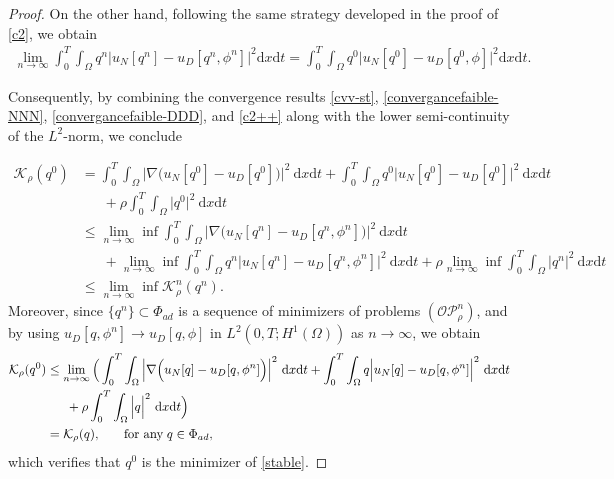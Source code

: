 \documentclass[a4paper,12pt,reqno,natbib]{amsart}
\newcommand{\dx} {\displaystyle\mathrm{d}x}
\newcommand{\dt} {\displaystyle\mathrm{d}t}
\begin{document}
{\begin{proof}
On the other hand, following the same strategy developed in the proof of \eqref{c2}, we obtain
\begin{align} \label{c2++}
    \lim_{n \rightarrow \infty} \int_0^T \int_\Omega q^n \Big| u_N[q^n] - u_D[q^n, \phi^n] \Big|^2 \dx \dt = \int_0^T \int_\Omega q^0 \Big| u_N[q^0] - u_D[q^0, \phi] \Big|^2 \dx \dt.
\end{align}

Consequently, by combining the convergence results \eqref{cvv-st}, \eqref{convergancefaible-NNN}, \eqref{convergancefaible-DDD}, and \eqref{c2++} along with the lower semi-continuity of the $L^2$-norm, we conclude

\begin{align*}
\mathcal{K}_\rho(q^0) &=\int_0^T \int_{\Omega}\Big|\nabla\Big(
 u_N[q^0]- u_D[q^0]\Big)\Big|^2\ \dx \dt + \int_0^T \int_{\Omega}q^0\Big|
 u_N[q^0]- u_D[q^0]\Big|^2\ \dx\dt\\
&\;\;\quad +\rho\int_0^T \int_{\Omega}\Big|q^0\Big|^2\ \dx\dt\\
&\leq\lim_{n\rightarrow\infty}\inf\int_0^T \int_{\Omega}\Big|\nabla\Big(
 u_N[q^n]- u_D[q^n,\phi^n]\Big)\Big|^2\ \dx \dt \\
&\;\;\quad + \lim_{n\rightarrow\infty}\inf\int_0^T \int_{\Omega}q^n\Big|
 u_N[q^n]- u_D[q^n,\phi^n]\Big|^2\ \dx\dt+ \rho\lim_{n\rightarrow\infty}\inf\int_0^T \int_{\Omega}\Big|q^n\Big|^2\ \dx\dt\\
&\leq \lim_{n\rightarrow\infty}\inf \mathcal{K}^n_\rho(q^n).
\end{align*}
Moreover, since \(\{ q^n \} \subset \Phi_{ad}\) is a sequence of minimizers of problems \((\mathcal{O}\mathcal{P}_{\rho}^n)\), and by using \(u_D[q,\phi^n] \longrightarrow u_D[q,\phi]\) in \(L^2(0, T; H^1(\Omega))\) as \(n \longrightarrow \infty\), we obtain
\begin{align*} 
\mathcal{K}_\rho(q^0)&\leq\lim_{n\rightarrow\infty}\Big(\int_0^T \int_{\Omega}\Big|\nabla\Big(
 u_N[q]- u_D[q,\phi^n]\Big)\Big|^2\ \dx \dt + \int_0^T \int_{\Omega}q\Big|
 u_N[q]- u_D[q,\phi^n]\Big|^2\ \dx\dt \\
 &\;\; \quad + \rho\int_0^T \int_{\Omega}\Big|q\Big|^2\ \dx\dt \Big)\\
&=\mathcal{K}_\rho(q), \quad \;\;\; \hbox{for any} \; q \in \Phi_{ad},
\end{align*}
which verifies that $q^0$ is the minimizer of \eqref{stable}.
\end{proof}



}
\end{document}
